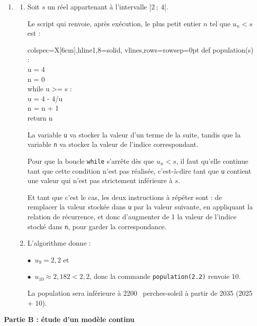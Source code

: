 \documentclass[10pt]{article}
\providecommand{\np}[2][]{{#2~#1}}
\begin{document}
\begin{enumerate}
	\item \begin{enumerate}
		\item Soit $s$ un réel appartenant à l'intervalle $]2~;~4[$.

Le script qui renvoie, après exécution, le plus petit entier $n$ tel que $u_{n}<s$ est :

		\begin{center}
			\begin{ttfamily}
			\begin{tblr}{colspec={X[6cm]},hline{1,8}={solid},
			vlines,rows={rowsep=0pt}}
			def population(s) :\\
			\quad u = 4\\
			\quad n = 0\\
			\quad while u >= s :\\
			\quad \quad u = 4 - 4/u\\
			\quad \quad n = n + 1\\
			\quad return n
			\end{tblr}
		\end{ttfamily}
		\end{center}

La variable \texttt{u} va stocker la valeur d'un terme de la suite, tandis que la variable \texttt{n} va stocker la valeur de l'indice correspondant.

Pour que la boucle \texttt{while} s'arrête dès que $u_n < s$, il faut qu'elle continue tant que cette condition n'est pas réalisée, c'est-à-dire tant que \texttt{u} contient une valeur qui n'est pas strictement inférieure à $s$.

Et tant que c'est le cas, les deux instructions à répéter sont : de remplacer la valeur stockée dans \texttt{u} par la valeur suivante, en appliquant la relation de récurrence, et donc d'augmenter de 1 la valeur de l'indice stocké dans \texttt{n}, pour garder la correspondance.
		\item L'algorithme donne :

$\bullet~$ $u_9 = 2,2$ et 

$\bullet~$ $u_{10} \approx 2,182 <  2,2$, donc la commande \texttt{population(2.2)} renvoie 10.

La population sera inférieure à \np{2200} perches-soleil à partir de 2035 (2025 + 10).
	\end{enumerate}
	\end{enumerate}

	\textbf{Partie B : étude d'un modèle continu}
	
\end{document}
